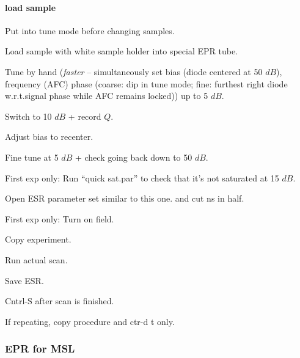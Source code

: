 \paragraph{load sample}
Put into tune mode before changing samples.

Load sample with white sample holder into special EPR tube.

 { Tune by hand ({\it faster} -- simultaneously set bias (diode centered at 50 $dB$), frequency (AFC) phase (coarse: dip in tune mode; fine: furthest right diode w.r.t.signal phase while AFC remains locked)) up to 5 $dB$.}

Switch to 10 $dB$ + record $Q$.

Adjust bias to recenter.

Fine tune at 5 $dB$ + check going back down to 50 $dB$.

First exp only: Run ``quick sat.par'' to check that it's not saturated at 15 $dB$.

Open ESR parameter set similar to this one.
 and cut ns in half.

First exp only: Turn on field.

Copy experiment.

Run actual scan.

Save ESR.

Cntrl-S after scan is finished.

If repeating, copy procedure and ctr-d t only.

\subsubsection{EPR for MSL}
